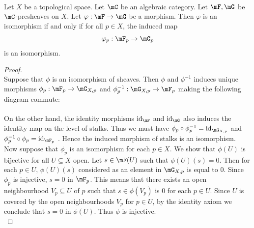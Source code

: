 \documentclass[a4paper]{article}
\begin{document}
\begin{prp}{}{}\\
Let $X$ be a topological space. Let $\mC$ be an algebraic category. Let $\mF,\mG$ be $\mC$-presheaves on $X$. Let $\varphi:\mF\to\mG$ be a morphism. Then $\varphi$ is an isomorphism if and only if for all $p\in X$, the induced map $$\varphi_p:\mF_p\to\mG_p$$ is an isomorphism. 
\begin{proof}\\
Suppose that $\phi$ is an isomorphism of sheaves. Then $\phi$ and $\phi^{-1}$ induces unique morphisms $\phi_p:\mF_p\to\mG_{X,p}$ and $\phi_p^{-1}:\mG_{X,p}\to\mF_p$ making the following diagram commute: \\
 \\
On the other hand, the identity morphisms $\text{id}_\mF$ and $\text{id}_\mG$ also induces the identity map on the level of stalks. Thus we must have $\phi_p\circ\phi^{-1}_p=\text{id}_{\mG_{X,p}}$ and $\phi^{-1}_p\circ\phi_p=\text{id}_{\mF_p}$ . Hence the induced morphism of stalks is an isomorphism. \\

Now suppose that $\phi_p$ is an isomorphism for each $p\in X$. We show that $\phi(U)$ is bijective for all $U\subseteq X$ open. Let $s\in\mF(U)$ such that $\phi(U)(s)=0$. Then for each $p\in U$, $\phi(U)(s)$ considered as an element in $\mG_{X,p}$ is equal to $0$. Since $\phi_p$ is injective, $s=0$ in $\mF_p$. This means that there exists an open neighbourhood $V_p\subseteq U$ of $p$ such that $s\in\phi(V_p)$ is $0$ for each $p\in U$. Since $U$ is covered by the open neighbourhoods $V_p$ for $p\in U$, by the identity axiom we conclude that $s=0$ in $\phi(U)$. Thus $\phi$ is injective. \\


\end{proof}
\end{prp}
\end{document}
